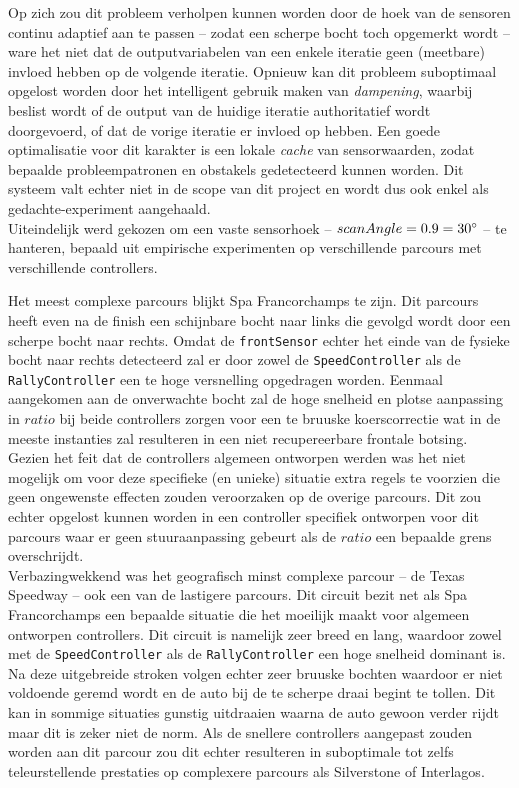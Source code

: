 \documentclass[10pt,a4paper]{article}
\begin{document}
			Op zich zou dit probleem verholpen kunnen worden door de hoek van de sensoren continu adaptief aan te passen -- zodat een scherpe bocht toch opgemerkt wordt -- ware het niet dat de outputvariabelen van een enkele iteratie geen (meetbare) invloed hebben op de volgende iteratie. Opnieuw kan dit probleem suboptimaal opgelost worden door het intelligent gebruik maken van \textit{dampening}, waarbij beslist wordt of de output van de huidige iteratie authoritatief wordt doorgevoerd, of dat de vorige iteratie er invloed op hebben. Een goede optimalisatie voor dit karakter is een lokale \textit{cache} van sensorwaarden, zodat bepaalde probleempatronen en obstakels gedetecteerd kunnen worden. Dit systeem valt echter niet in de scope van dit project en wordt dus ook enkel als gedachte-experiment aangehaald.\\

			Uiteindelijk werd gekozen om een vaste sensorhoek -- $scanAngle = 0.9 = 30 \degree$ -- te hanteren, bepaald uit empirische experimenten op verschillende parcours met verschillende controllers.

			Het meest complexe parcours blijkt Spa Francorchamps te zijn. Dit parcours heeft even na de finish een schijnbare bocht naar links die gevolgd wordt door een scherpe bocht naar rechts. Omdat de \texttt{frontSensor} echter het einde van de fysieke bocht naar rechts detecteerd zal er door zowel de \texttt{SpeedController} als de \texttt{RallyController} een te hoge versnelling opgedragen worden. Eenmaal aangekomen aan de onverwachte bocht zal de hoge snelheid en plotse aanpassing in $ratio$ bij beide controllers zorgen voor een te bruuske koerscorrectie wat in de meeste instanties zal resulteren in een niet recupereerbare frontale botsing. Gezien het feit dat de controllers algemeen ontworpen werden was het niet mogelijk om voor deze specifieke (en unieke) situatie extra regels te voorzien die geen ongewenste effecten zouden veroorzaken op de overige parcours. Dit zou echter opgelost kunnen worden in een controller specifiek ontworpen voor dit parcours waar er geen stuuraanpassing gebeurt als de $ratio$ een bepaalde grens overschrijdt.\\

			Verbazingwekkend was het geografisch minst complexe parcour -- de Texas Speedway -- ook een van de lastigere parcours. Dit circuit bezit net als Spa Francorchamps een bepaalde situatie die het moeilijk maakt voor algemeen ontworpen controllers. Dit circuit is namelijk zeer breed en lang, waardoor zowel met de \texttt{SpeedController} als de \texttt{RallyController} een hoge snelheid dominant is. Na deze uitgebreide stroken volgen echter zeer bruuske bochten waardoor er niet voldoende geremd wordt en de auto bij de te scherpe draai begint te tollen. Dit kan in sommige situaties gunstig uitdraaien waarna de auto gewoon verder rijdt maar dit is zeker niet de norm. Als de snellere controllers aangepast zouden worden aan dit parcour zou dit echter resulteren in suboptimale tot zelfs teleurstellende prestaties op complexere parcours als Silverstone of Interlagos.\\
\end{document}
